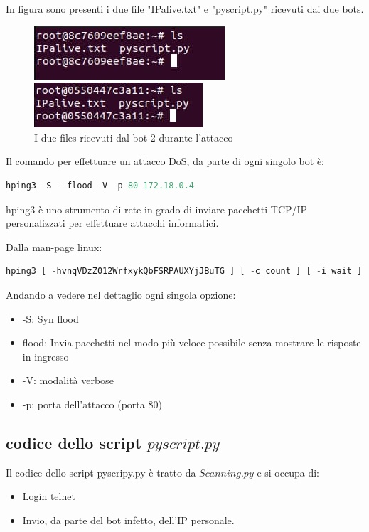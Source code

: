 In figura sono presenti i due file "IPalive.txt" e "pyscript.py" ricevuti dai due bots.
\begin{figure}[H]
    \centering
    \includegraphics{UNINA_MSc_Thesis_Project/img/Esecuzione/bot1_received.jpg}
    \caption{I due files ricevuti dal bot 1 durante l'attacco}
    \includegraphics{UNINA_MSc_Thesis_Project/img/Esecuzione/bot2_received.jpg}
    \caption{I due files ricevuti dal bot 2 durante l'attacco}
    \label{fig:my_label}
\end{figure}

Il comando per effettuare un attacco DoS, da parte di ogni singolo bot è:

\begin{lstlisting}[language=Python]
hping3 -S --flood -V -p 80 172.18.0.4
\end{lstlisting}

hping3 è uno strumento di rete in grado di inviare pacchetti TCP/IP personalizzati per effettuare attacchi informatici.

Dalla man-page linux: 
\begin{lstlisting}[language=Python]
hping3 [ -hvnqVDzZ012WrfxykQbFSRPAUXYjJBuTG ] [ -c count ] [ -i wait ] [ --fast ] [ -I interface ] [ -9 signature ] [ -a host ] [ -t ttl ] [ -N ip id ] [ -H ip protocol ] [ -g fragoff ] [ -m mtu ] [ -o tos ] [ -C icmp type ] [ -K icmp code ] [ -s source port ] [ -p[+][+] dest port ] [ -w tcp window ] [ -O tcp offset ] [ -M tcp sequence number ] [ -L tcp ack ] [ -d data size ] [ -E filename ] [ -e signature ] [ --icmp-ipver version ] [ --icmp-iphlen length ] [ --icmp-iplen length ] [ --icmp-ipid id ] [ --icmp-ipproto protocol ] [ --icmp-cksum checksum ] [ --icmp-ts ] [ --icmp-addr ] [ --tcpexitcode ] [ --tcp-timestamp ] [ --tr-stop ] [ --tr-keep-ttl ] [ --tr-no-rtt ] [ --rand-dest ] [ --rand-source ] [ --beep ] hostname
\end{lstlisting}

Andando a vedere nel dettaglio ogni singola opzione:
\begin{itemize}
    \item -S: Syn flood
    \item flood: Invia pacchetti nel modo più veloce possibile senza mostrare le risposte in ingresso 
    \item -V: modalità verbose 
    \item -p: porta dell'attacco (porta 80)
\end{itemize} 

\subsection{codice dello script $pyscript.py$}
Il codice dello script pyscripy.py è tratto da $Scanning.py$ e si occupa di:
\begin{itemize}
    \item Login telnet
    \item Invio, da parte del bot infetto, dell'IP personale.
\end{itemize}

